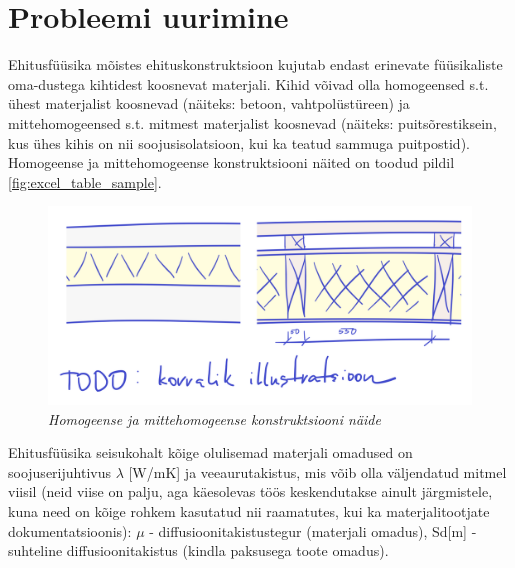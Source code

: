 \section{Probleemi uurimine}

Ehitusfüüsika mõistes ehituskonstruktsioon kujutab endast erinevate füüsikaliste oma-dustega kihtidest 
koosnevat materjali. Kihid võivad olla homogeensed s.t. ühest materjalist koosnevad (näiteks: betoon, vahtpolüstüreen) ja
mittehomogeensed s.t. mitmest materjalist koosnevad (näiteks: puitsõrestiksein, kus ühes kihis on nii soojusisolatsioon, 
kui ka teatud sammuga puitpostid). Homogeense ja mittehomogeense konstruktsiooni näited on toodud pildil \ref{fig:excel_table_sample}.

\begin{figure}[ht]
    \centering
    \includegraphics[width=.8\textwidth]{figures/problem_statement/06_un_non_unif_sample.png}
    \caption{\textit{Homogeense ja mittehomogeense konstruktsiooni näide}}
    \label{fig:construction_samples}
\end{figure}

Ehitusfüüsika seisukohalt kõige olulisemad materjali omadused on soojuserijuhtivus \begin{math}\lambda\end{math} [W/mK]
ja veeaurutakistus, mis võib olla väljendatud mitmel viisil (neid viise on palju, aga käesolevas töös keskendutakse 
ainult järgmistele, kuna need on kõige rohkem kasutatud nii raamatutes, kui ka materjalitootjate dokumentatsioonis):
\begin{math}\mu\end{math} - diffusioonitakistustegur (materjali omadus), Sd[m] - suhteline diffusioonitakistus (kindla paksusega toote omadus).



